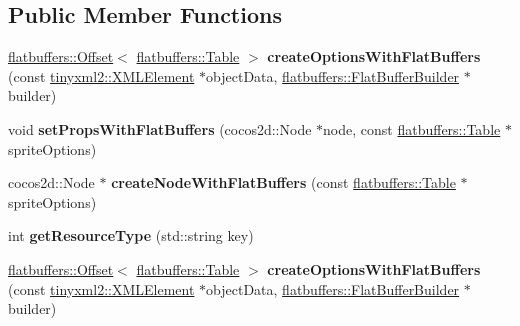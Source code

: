 \subsection*{Public Member Functions}
\begin{DoxyCompactItemize}
\item 
\mbox{\label{classcocostudio_1_1SpriteReader_a5ee2ae5fc63c162e5f592c0de32be20b}} 
\hyperlink{structflatbuffers_1_1Offset}{flatbuffers\+::\+Offset}$<$ \hyperlink{classflatbuffers_1_1Table}{flatbuffers\+::\+Table} $>$ {\bfseries create\+Options\+With\+Flat\+Buffers} (const \hyperlink{classtinyxml2_1_1XMLElement}{tinyxml2\+::\+X\+M\+L\+Element} $\ast$object\+Data, \hyperlink{classflatbuffers_1_1FlatBufferBuilder}{flatbuffers\+::\+Flat\+Buffer\+Builder} $\ast$builder)
\item 
\mbox{\label{classcocostudio_1_1SpriteReader_a30678daebf2b70f147f2484b7a342bec}} 
void {\bfseries set\+Props\+With\+Flat\+Buffers} (cocos2d\+::\+Node $\ast$node, const \hyperlink{classflatbuffers_1_1Table}{flatbuffers\+::\+Table} $\ast$sprite\+Options)
\item 
\mbox{\label{classcocostudio_1_1SpriteReader_ac171c8a95ba71f32e132ca995b0ea2b8}} 
cocos2d\+::\+Node $\ast$ {\bfseries create\+Node\+With\+Flat\+Buffers} (const \hyperlink{classflatbuffers_1_1Table}{flatbuffers\+::\+Table} $\ast$sprite\+Options)
\item 
\mbox{\label{classcocostudio_1_1SpriteReader_ab82e62ddc3b4b62ceff881c676a3cea2}} 
int {\bfseries get\+Resource\+Type} (std\+::string key)
\item 
\mbox{\label{classcocostudio_1_1SpriteReader_abaf53be776472daf4b2e39a36ffe680b}} 
\hyperlink{structflatbuffers_1_1Offset}{flatbuffers\+::\+Offset}$<$ \hyperlink{classflatbuffers_1_1Table}{flatbuffers\+::\+Table} $>$ {\bfseries create\+Options\+With\+Flat\+Buffers} (const \hyperlink{classtinyxml2_1_1XMLElement}{tinyxml2\+::\+X\+M\+L\+Element} $\ast$object\+Data, \hyperlink{classflatbuffers_1_1FlatBufferBuilder}{flatbuffers\+::\+Flat\+Buffer\+Builder} $\ast$builder)
\item 
\mbox{\label{classcocostudio_1_1SpriteReader_a30678daebf2b70f147f2484b7a342bec}} 

\end{DoxyCompactItemize}
